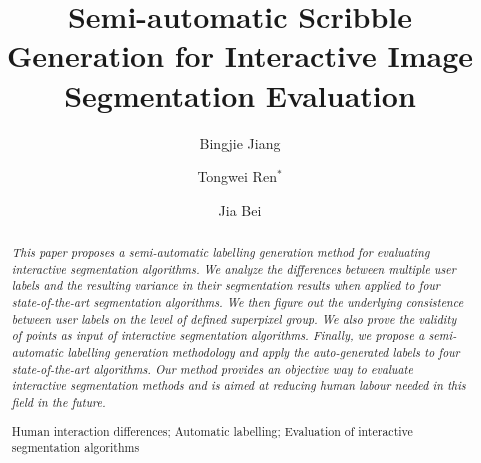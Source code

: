 \documentclass[runningheads,a4paper]{llncs}
\newcommand{\keywords}[1]{\par\addvspace\baselineskip
\noindent\keywordname\enspace\ignorespaces#1}
\begin{document}
\mainmatter  %

\title{Semi-automatic Scribble Generation for Interactive Image Segmentation Evaluation}


%
%
\author{Bingjie Jiang \and Tongwei Ren$^{*}$ \and Jia Bei}
%


\maketitle


\begin{abstract}
\emph{This paper proposes a semi-automatic labelling generation method for evaluating interactive segmentation algorithms. We analyze the differences between multiple user labels and the resulting variance in their segmentation results when applied to four state-of-the-art segmentation algorithms. We then figure out the underlying consistence between user labels on the level of defined superpixel group. We also prove the validity of points as input of interactive segmentation algorithms. Finally, we propose a semi-automatic labelling generation methodology and apply the auto-generated labels to four state-of-the-art algorithms. Our method provides an objective way to evaluate interactive segmentation methods and is aimed at reducing human labour needed in this field in the future.
}

\keywords{Human interaction differences; Automatic labelling; Evaluation of interactive segmentation algorithms}
\end{abstract}
\end{document}
